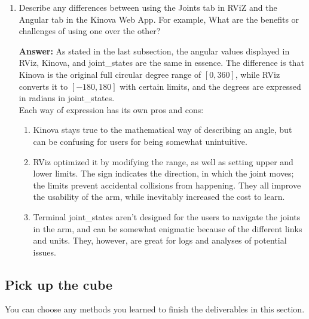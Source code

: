 \documentclass[12pt]{article}
\begin{document}
\begin{enumerate}
\begin{enumerate}
    \end{enumerate}
    
    \item Describe any differences between using the Joints tab in RViZ and the Angular tab in the Kinova Web App. For example, What are the benefits or challenges of using one over the other?
    
    \textbf{Answer: }As stated in the last subsection, the angular values displayed in RViz, Kinova, and joint\_states are the same in essence. The difference is that Kinova is the original full circular degree range of $[0, 360]$, while RViz converts it to $[-180, 180]$ with certain limits, and the degrees are expressed in radians in joint\_states.
    \\Each way of expression has its own pros and cons:

    \begin{enumerate}
        \item Kinova stays true to the mathematical way of describing an angle, but can be confusing for users for being somewhat unintuitive.
        \item RViz optimized it by modifying the range, as well as setting upper and lower limits. The sign indicates the direction, in which the joint moves; the limits prevent accidental collisions from happening. They all improve the usability of the arm, while inevitably increased the cost to learn.
        \item Terminal joint\_states aren't designed for the users to navigate the joints in the arm, and can be somewhat enigmatic because of the different links and units. They, however, are great for logs and analyses of potential issues.
    \end{enumerate}
     
\end{enumerate}


\subsection{Pick up the cube}
You can choose any methods you learned to finish the deliverables in this section.
\end{document}
